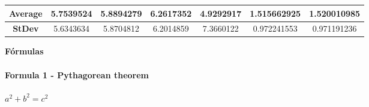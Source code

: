 \documentclass[idxtotoc,hyperref,openany]{labbook} %
\begin{document}
\begin{table}[]
\begin{tabular}{ccccccc}
		\multicolumn{1}{|c|}{\textbf{Average}}  & \multicolumn{1}{c|}{5.7539524}         & \multicolumn{1}{c|}{5.8894279}         & \multicolumn{1}{c|}{6.2617352}         & \multicolumn{1}{c|}{4.9292917}    & \multicolumn{1}{c|}{1.515662925}        & \multicolumn{1}{c|}{1.520010985}        \\ \hline
		\multicolumn{1}{|c|}{\textbf{StDev}}    & \multicolumn{1}{c|}{5.6343634}         & \multicolumn{1}{c|}{5.8704812}         & \multicolumn{1}{c|}{6.2014859}         & \multicolumn{1}{c|}{7.3660122}    & \multicolumn{1}{c|}{0.972241553}        & \multicolumn{1}{c|}{0.971191236}        \\ \hline
	\end{tabular}
\end{table}









\newpage

\huge \textbf{Fórmulas} \\ \\

\normalsize \textbf{Formula 1 - Pythagorean theorem}\\ \\
$a^2 + b^2 = c^2$\\ \\




\end{document}
